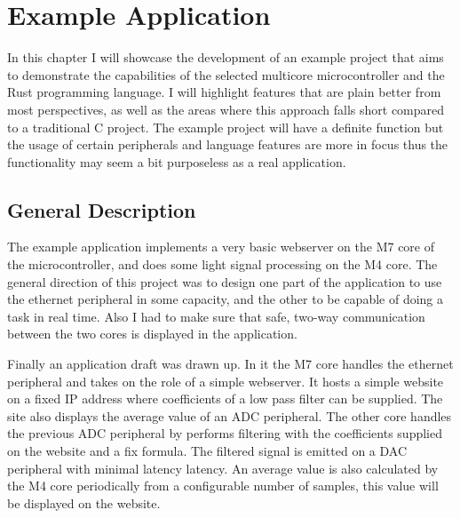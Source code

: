 \chapter{Example Application}

In this chapter I will showcase the development of an example project that aims to demonstrate the capabilities of the selected multicore microcontroller and the Rust programming language. I will highlight features that are plain better from most perspectives, as well as the areas where this approach falls short compared to a traditional C project. The example project will have a definite function but the usage of certain peripherals and language features are more in focus thus the functionality may seem a bit purposeless as a real application.

\section{General Description}

The example application implements a very basic webserver on the M7 core of the microcontroller, and does some light signal processing on the M4 core. The general direction of this project was to design one part of the application to use the ethernet peripheral in some capacity, and the other to be capable of doing a task in real time. Also I had to make sure that safe, two-way communication between the two cores is displayed in the application.

Finally an application draft was drawn up. In it the M7 core handles the ethernet peripheral and takes on the role of a simple webserver. It hosts a simple website on a fixed IP address where coefficients of a low pass filter can be supplied. The site also displays the average value of an ADC peripheral. The other core handles the previous ADC peripheral by performs filtering with the coefficients supplied on the website and a fix formula. The filtered signal is emitted on a DAC peripheral with minimal latency latency. An average value is also calculated by the M4 core periodically from a configurable number of samples, this value will be displayed on the website.

